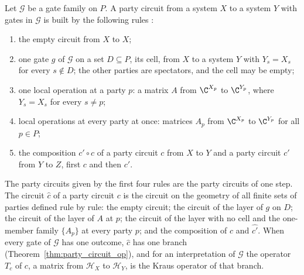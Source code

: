 \begin{definition}
    \label{def:party_circuit}
    \leanok
    Let $\mathcal G$ be a gate family on $P$. A party circuit from a system $X$ to a
    system $Y$ with gates in $\mathcal G$ is built by the following rules
    \cite[Section~5.1]{OpenAI2026PolynomialPEPS}:
    \begin{enumerate}
        \item the empty circuit from $X$ to $X$;
        \item one gate $g$ of $\mathcal G$ on a set $D\subseteq P$, its cell, from $X$
              to a system $Y$ with $Y_s=X_s$ for every $s\notin D$; the other parties
              are spectators, and the cell may be empty;
        \item one local operation at a party $p$: a matrix $A$ from $\C^{X_p}$ to
              $\C^{Y_p}$, where $Y_s=X_s$ for every $s\neq p$;
        \item local operations at every party at once: matrices $A_p$ from
              $\C^{X_p}$ to $\C^{Y_p}$ for all $p\in P$;
        \item the composition $c'\circ c$ of a party circuit $c$ from $X$ to $Y$ and a
              party circuit $c'$ from $Y$ to $Z$, first $c$ and then $c'$.
    \end{enumerate}
    The party circuits given by the first four rules are the party circuits of one
    step. The circuit $\widehat c$ of a party circuit $c$ is the circuit on the
    geometry of all finite sets of parties defined rule by rule: the empty circuit;
    the circuit of the layer of $g$ on $D$; the circuit of the layer of $A$ at $p$;
    the circuit of the layer with no cell and the one-member family $\{A_p\}$ at every
    party $p$; and the composition of $\widehat c$ and $\widehat{c'}$. When every gate
    of $\mathcal G$ has one outcome, $\widehat c$ has one branch
    (Theorem~\ref{thm:party_circuit_op}), and for an interpretation of $\mathcal G$ the
    operator $T_c$ of $c$, a matrix from $\mathcal H_X$ to $\mathcal H_Y$, is the
    Kraus operator of that branch.
\end{definition}

